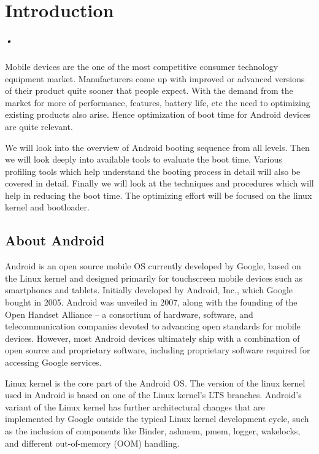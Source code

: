 

\chapter{Introduction}
\label{report}
\paragraph*{•}

\hspace{8mm} 

\noindent Mobile devices are the one of the most competitive consumer technology equipment market.
Manufacturers come up with improved or advanced versions of their product quite sooner that
people expect. With the demand from the market for more of performance, features, battery
life, etc the need to optimizing existing products also arise. Hence optimization of boot time
for Android devices are quite relevant.

We will look into the overview of Android booting sequence from all levels. Then we will look
deeply into available tools to evaluate the boot time. Various profiling tools which help understand
the booting process in detail will also be covered in detail. Finally we will look at the techniques
and procedures which will help in reducing the boot time. The optimizing effort will be focused on the
linux kernel and bootloader.

\section{About Android}

Android is an open source mobile OS currently developed by Google, based on the Linux kernel and designed
primarily for touchscreen mobile devices such as smartphones and tablets. Initially developed
by Android, Inc., which Google bought in 2005. Android was unveiled in 2007, along with the
founding of the Open Handset Alliance – a consortium of hardware, software, and telecommunication
companies devoted to advancing open standards for mobile devices. However, most Android devices
ultimately ship with a combination of open source and proprietary software, including proprietary
software required for accessing Google services.


Linux kernel is the core part of the Android OS. The version of the linux kernel used in Android is
based on one of the Linux kernel's LTS branches. Android's variant of the Linux kernel has further
architectural changes that are implemented by Google outside the typical Linux kernel development
cycle, such as the inclusion of components like Binder, ashmem, pmem, logger, wakelocks,
and different out-of-memory (OOM) handling.

